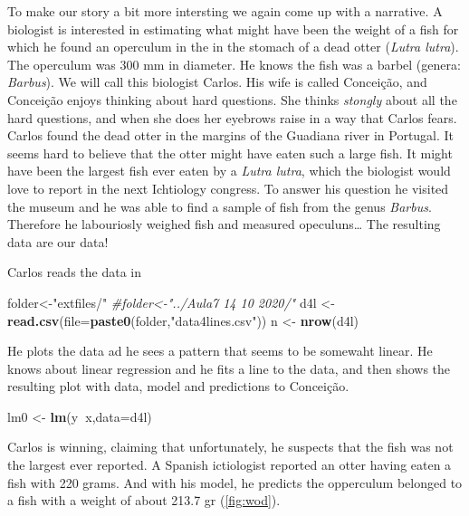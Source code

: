 \documentclass[
]{book}
\newenvironment{Shaded}{\begin{snugshade}}{\end{snugshade}}
\newcommand{\CommentTok}[1]{\textcolor[rgb]{0.56,0.35,0.01}{\textit{#1}}}
\newcommand{\DataTypeTok}[1]{\textcolor[rgb]{0.13,0.29,0.53}{#1}}
\newcommand{\KeywordTok}[1]{\textcolor[rgb]{0.13,0.29,0.53}{\textbf{#1}}}
\newcommand{\NormalTok}[1]{#1}
\newcommand{\OperatorTok}[1]{\textcolor[rgb]{0.81,0.36,0.00}{\textbf{#1}}}
\newcommand{\StringTok}[1]{\textcolor[rgb]{0.31,0.60,0.02}{#1}}
\begin{document}
To make our story a bit more intersting we again come up with a narrative. A biologist is interested in estimating what might have been the weight of a fish for which he found an operculum in the in the stomach of a dead otter (\emph{Lutra lutra}). The operculum was 300 mm in diameter. He knows the fish was a barbel (genera: \emph{Barbus}). We will call this biologist Carlos. His wife is called Conceição, and Conceição enjoys thinking about hard questions. She thinks \emph{stongly} about all the hard questions, and when she does her eyebrows raise in a way that Carlos fears. Carlos found the dead otter in the margins of the Guadiana river in Portugal. It seems hard to believe that the otter might have eaten such a large fish. It might have been the largest fish ever eaten by a \emph{Lutra lutra}, which the biologist would love to report in the next Ichtiology congress. To answer his question he visited the museum and he was able to find a sample of fish from the genus \emph{Barbus}. Therefore he labouriosly weighed fish and measured opeculuns\ldots{} The resulting data are our data!

Carlos reads the data in

\begin{Shaded}
\begin{Highlighting}[]
\NormalTok{folder<-}\StringTok{"extfiles/"}
\CommentTok{#folder<-"../Aula7 14 10 2020/"}
\NormalTok{d4l <-}\StringTok{ }\KeywordTok{read.csv}\NormalTok{(}\DataTypeTok{file=}\KeywordTok{paste0}\NormalTok{(folder,}\StringTok{"data4lines.csv"}\NormalTok{))}
\NormalTok{n <-}\StringTok{ }\KeywordTok{nrow}\NormalTok{(d4l)}
\end{Highlighting}
\end{Shaded}

He plots the data ad he sees a pattern that seems to be somewaht linear. He knows about linear regression and he fits a line to the data, and then shows the resulting plot with data, model and predictions to Conceição.

\begin{Shaded}
\begin{Highlighting}[]
\NormalTok{lm0 <-}\StringTok{ }\KeywordTok{lm}\NormalTok{(y}\OperatorTok{~}\NormalTok{x,}\DataTypeTok{data=}\NormalTok{d4l)}
\end{Highlighting}
\end{Shaded}

Carlos is winning, claiming that unfortunately, he suspects that the fish was not the largest ever reported. A Spanish ictiologist reported an otter having eaten a fish with 220 grams. And with his model, he predicts the opperculum belonged to a fish with a weight of about 213.7 gr (\ref{fig:wod}).
\end{document}
